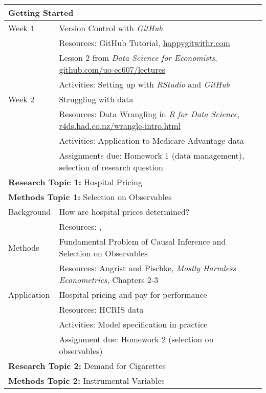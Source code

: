 \documentclass{article}
\begin{document}
\begin{longtable}{lp{13cm}}
  \hline
  \multicolumn{2}{l}{\textbf{Getting Started}} \\
  \hline\hline
  Week 1 & Version Control with \textit{GitHub} \\
         & Resources: GitHub Tutorial, \href{https://happygitwithr.com/}{happygitwithr.com} \\
         & \hspace{.4in} Lesson 2 from \textit{Data Science for Economists}, \href{https://github.com/uo-ec607/lectures}{github.com/uo-ec607/lectures} \\
         & Activities: Setting up with \textit{RStudio} and \textit{GitHub} \\
  \hline
  Week 2 & Struggling with data \\
         & Resources: Data Wrangling in \textit{R for Data Science}, \href{https://r4ds.had.co.nz/wrangle-intro.html}{r4ds.had.co.nz/wrangle-intro.html} \\
         & Activities: Application to Medicare Advantage data \\
         & Assignments due: Homework 1 (data management), selection of research question \\
  \hline
  \multicolumn{2}{l}{\textbf{Research Topic 1:} Hospital Pricing} \\
  \multicolumn{2}{l}{\textbf{Methods Topic 1:} Selection on Observables} \\
  \hline\hline
  Background & How are hospital prices determined? \\
             & Resources: \cite{cooper2017}, \cite{darden2018} \\
  \hline
  Methods & Fundamental Problem of Causal Inference and Selection on Observables \\
          & Resources: Angrist and Pischke, \textit{Mostly Harmless Econometrics}, Chapters 2-3 \\
  \hline
  Application & Hospital pricing and pay for performance \\
              & Resources: HCRIS data \\
              & Activities: Model specification in practice \citep{darden2018} \\
              & Assignment due: Homework 2 (selection on observables) \\
  \hline
  \multicolumn{2}{l}{\textbf{Research Topic 2:} Demand for Cigarettes} \\
  \multicolumn{2}{l}{\textbf{Methods Topic 2:} Instrumental Variables} \\

\end{longtable}
\end{document}
